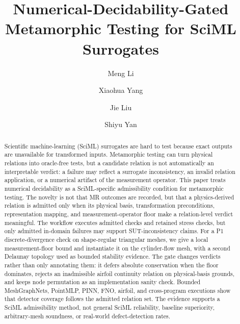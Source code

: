 \documentclass[preprint,12pt,authoryear]{elsarticle}
\begin{document}
\begin{frontmatter}

\title{Numerical-Decidability-Gated Metamorphic Testing for SciML Surrogates}

\author[inst1,inst2,inst3]{Meng Li}
\author[inst1,inst2,inst3]{Xiaohua Yang}
\author[inst1,inst2,inst3]{Jie Liu}
\author[inst1,inst2,inst3]{Shiyu Yan}

\begin{abstract}
Scientific machine-learning (SciML) surrogates are hard to test because exact
outputs are unavailable for transformed inputs. Metamorphic testing can
turn physical relations into oracle-free tests, but a candidate relation is not
automatically an interpretable verdict: a failure may reflect a surrogate
inconsistency, an invalid relation application, or a numerical artifact of the
measurement operator. This paper treats numerical decidability as a
SciML-specific admissibility condition for metamorphic testing. The novelty is
not that MR outcomes are recorded, but that a physics-derived relation is
admitted only when its physical basis, transformation preconditions,
representation mapping, and measurement-operator floor make a relation-level
verdict meaningful. The workflow executes admitted checks and retained stress
checks, but only admitted in-domain failures may support SUT-inconsistency
claims. For a P1
discrete-divergence check on shape-regular triangular meshes, we give a local
measurement-floor bound and instantiate it on the cylinder-flow mesh, with a
second Delaunay topology used as bounded stability evidence. The gate changes
verdicts rather than only annotating them: it defers absolute conservation when
the floor dominates, rejects an inadmissible airfoil continuity relation on
physical-basis grounds, and keeps node permutation as an implementation sanity
check. Bounded MeshGraphNets, PointMLP, PINN, FNO, airfoil, and cross-program
executions show that detector coverage follows the admitted relation set. The
evidence supports a SciML admissibility method, not general SciML reliability,
baseline superiority, arbitrary-mesh soundness, or real-world defect-detection
rates.
\end{abstract}


\end{frontmatter}
\end{document}
